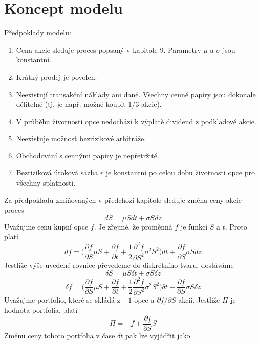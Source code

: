 \documentclass[a4paper]{book}
\begin{document}
\section{Koncept modelu}
Předpoklady modelu:
\begin{enumerate}
\item Cena akcie sleduje proces popsaný v kapitole 9. Parametry $\mu$ a $\sigma$ jsou konstantní.
\item Krátký prodej je povolen.
\item Neexistují transakční náklady ani daně. Všechny cenné papíry jsou dokonale dělitelné (tj. je např. možné koupit 1/3 akcie).
\item V průběhu životnosti opce nedochází k výplatě dividend z podkladové akcie.
\item Neexistuje možnost bezrizikové arbitráže.
\item Obchodování s cennými papíry je nepřetržité.
\item Bezriziková úroková sazba $r$ je konstantní po celou dobu životnosti opce pro všechny splatnosti.
\end{enumerate}
Za předpokladů zmiňovaných v předchozí kapitole sleduje změna ceny akcie proces
\begin{equation*}
d S = \mu S d t + \sigma S d z
\end{equation*}
Uvažujme cenu kupní opce $f$. Je zřejmé, že proměnná $f$ je funkcí $S$ a $t$. Proto platí
\begin{equation*}
d f = \bigg( \frac{\partial f}{\partial S}\mu S + \frac{\partial f}{\partial t} + \frac{1}{2}\frac{\partial^2 f}{\partial S^2}\sigma^2 S^2 \bigg) dt + \frac{\partial f}{\partial S}\sigma S d z
\end{equation*}
Jestliže výše uvedené rovnice převedeme do diskrétního tvaru, dostáváme
\begin{equation}
\delta S = \mu S \delta t + \sigma S \delta z
\end{equation}
\begin{equation}
\delta f = \bigg(\frac{\partial f}{\partial S} \mu S + \frac{\partial f}{\partial t} + \frac{1}{2}\frac{\partial^2 f}{\partial S^2}\sigma^2 S^2 \bigg) \delta t + \frac{\partial f}{\partial S}\sigma S \delta z
\end{equation}
Uvažujme portfolio, které se skládá z $-1$ opce a $\partial f / \partial S$ akcií. Jestliže $\Pi$ je hodnota portfolia, platí
\begin{equation*}
\Pi = -f + \frac{\partial f}{\partial S}S
\end{equation*}
Změnu ceny tohoto portfolia v čase $\delta t$ pak lze vyjádřit jako
\end{document}
